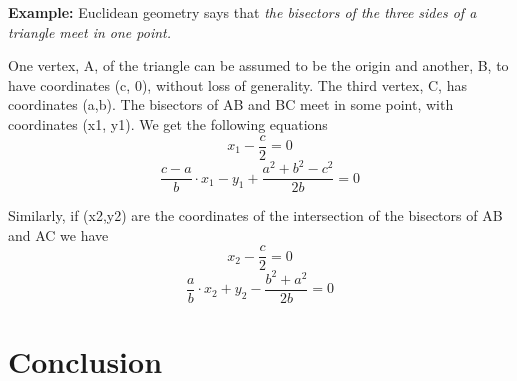 \documentclass[11pt]{article}
\begin{document}
\textbf {Example:} Euclidean geometry says that \textit{the bisectors of the three sides of a triangle meet in one point.}
 
One vertex, A, of the triangle can be assumed to be the origin and another, B, to have coordinates (c, 0), without loss of generality. The third vertex, C, has coordinates (a,b).
The bisectors of AB and BC meet in some point, with coordinates (x1, y1). We get the following equations
\begin{equation} 
    x_1- \frac {c}{2}=0
\end{equation}
\begin{equation} 
    \frac {c-a}{b} \cdotp x_1 - y_1 + \frac {a^2 + b^2 - c^2}{2b} = 0
\end{equation}

Similarly, if (x2,y2) are the coordinates of the intersection of the bisectors of AB and AC we have
\begin{equation} 
    x_2- \frac {c}{2}=0
\end{equation}
\begin{equation} 
    \frac {a}{b} \cdotp x_2 + y_2 - \frac {b^2 + a^2}{2b} = 0
\end{equation}

\section{Conclusion}
\end{document}
